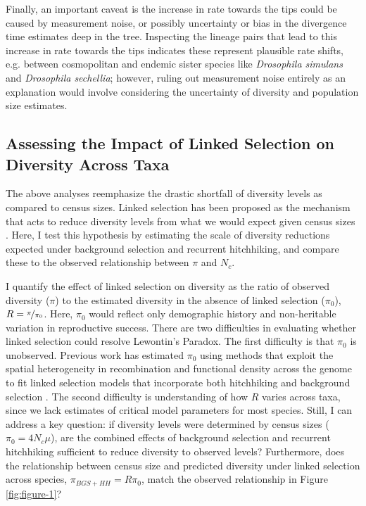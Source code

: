 \documentclass[11pt]{article}
\begin{document}
Finally, an important caveat is the increase in rate towards the tips could be
caused by measurement noise, or possibly uncertainty or bias in the divergence
time estimates deep in the tree. Inspecting the lineage pairs that lead to this
increase in rate towards the tips indicates these represent plausible rate
shifts, e.g.  between cosmopolitan and endemic sister species like
\emph{Drosophila simulans} and \emph{Drosophila sechellia}; however, ruling out
measurement noise entirely as an explanation would involve considering the
uncertainty of diversity and population size estimates.

\subsection*{Assessing the Impact of Linked Selection on Diversity Across Taxa}

The above analyses reemphasize the drastic shortfall of diversity levels as
compared to census sizes. Linked selection has been proposed as the mechanism
that acts to reduce diversity levels from what we would expect given census
sizes \parencite{Maynard_Smith1974-zr,Gillespie2000-mh,Corbett-Detig2015-gt}.
Here, I test this hypothesis by estimating the scale of diversity reductions
expected under background selection and recurrent hitchhiking, and compare
these to the observed relationship between $\pi$ and $N_c$. 

I quantify the effect of linked selection on diversity as the ratio of observed
diversity ($\pi$) to the estimated diversity in the absence of linked selection
($\pi_0$), $R = \nicefrac{\pi}{\pi_0}$. Here, $\pi_0$ would reflect only
demographic history and non-heritable variation in reproductive success. There
are two difficulties in evaluating whether linked selection could resolve
Lewontin's Paradox. The first difficulty is that $\pi_0$ is unobserved.
Previous work has estimated $\pi_0$ using methods that exploit the spatial
heterogeneity in recombination and functional density across the genome to fit
linked selection models that incorporate both hitchhiking and background
selection \parencite{Elyashiv2016-vt,Corbett-Detig2015-gt}. The second
difficulty is understanding of how $R$ varies across taxa, since we lack
estimates of critical model parameters for most species. Still, I can address a
key question: if diversity levels were determined by census sizes ($\pi_0 =
4N_c \mu$), are the combined effects of background selection and recurrent
hitchhiking sufficient to reduce diversity to observed levels? Furthermore,
does the relationship between census size and predicted diversity under linked
selection across species, $\pi_{BGS+HH} = R \pi_0$, match the observed
relationship in Figure \ref{fig:figure-1}? 
\end{document}
